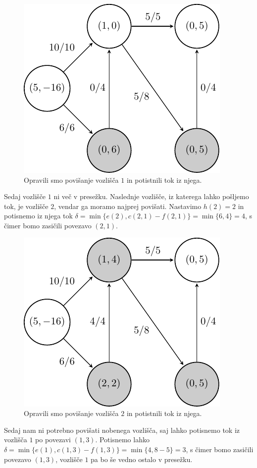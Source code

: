 \documentclass[mat1]{fmfdelo}
\begin{document}
\begin{figure}[H]
  \centering
  \includegraphics{images/graf2-3.pdf}
  \caption{Opravili smo povišanje vozlišča $1$ in potistnili tok iz njega.}
\end{figure}

Sedaj vozlišče $1$ ni več v presežku. Naslednje vozlišče, iz katerega lahko pošljemo tok, je vozlišče $2$, vendar ga moramo najprej povišati.
Nastavimo $h(2) = 2$ in potisnemo iz njega tok $\delta = \min\{e(2), c(2,1) - f(2,1)\} = \min\{6, 4\} = 4$, s čimer bomo zasičili
povezavo $(2,1)$.

\begin{figure}[H]
  \centering
  \includegraphics{images/graf2-4.pdf}
  \caption{Opravili smo povišanje vozlišča $2$ in potistnili tok iz njega.}
\end{figure}

Sedaj nam ni potrebno povišati nobenega vozlišča, saj lahko potisnemo tok iz vozlišča $1$ po povezavi $(1,3)$. Potisnemo lahko
$\delta = \min \{e(1), c(1,3) - f(1,3)\} = \min \{4, 8-5\} = 3$, s čimer bomo zasičili povezavo $(1,3)$, vozlišče $1$ pa bo še vedno
ostalo v presežku.
\end{document}
